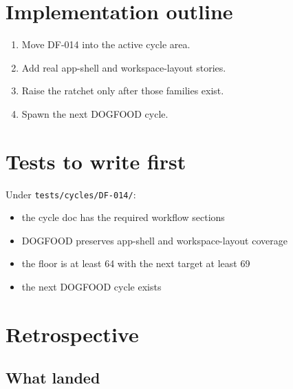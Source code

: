 \section{Implementation outline}\label{record-076-implementation-outline}

\begin{enumerate}
\def\labelenumi{\arabic{enumi}.}
\tightlist
\item
  Move DF-014 into the active cycle area.
\item
  Add real app-shell and workspace-layout stories.
\item
  Raise the ratchet only after those families exist.
\item
  Spawn the next DOGFOOD cycle.
\end{enumerate}

\section{Tests to write first}\label{record-076-tests-to-write-first}

Under \texttt{t\allowbreak{}e\allowbreak{}s\allowbreak{}t\allowbreak{}s\allowbreak{}/\allowbreak{}c\allowbreak{}y\allowbreak{}c\allowbreak{}l\allowbreak{}e\allowbreak{}s\allowbreak{}/\allowbreak{}D\allowbreak{}F\allowbreak{}-\allowbreak{}0\allowbreak{}1\allowbreak{}4\allowbreak{}/}:

\begin{itemize}
\tightlist
\item
  the cycle doc has the required workflow sections
\item
  DOGFOOD preserves app-shell and workspace-layout coverage
\item
  the floor is at least 64 with the next target at least 69
\item
  the next DOGFOOD cycle exists
\end{itemize}

\section{Retrospective}\label{record-076-retrospective}

\subsection{What landed}\label{record-076-what-landed}

